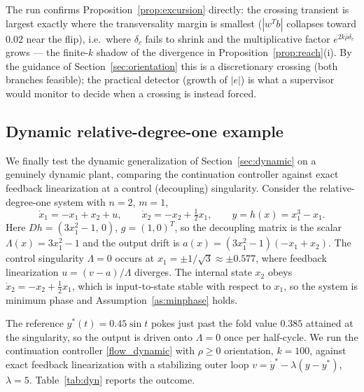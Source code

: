 \documentclass[11pt,american]{article}
\theoremstyle{definition}
\theoremstyle{plain}
\theoremstyle{remark}
\begin{document}
The run confirms Proposition~\ref{prop:excursion} directly: the crossing transient is largest exactly where the transversality margin is smallest ($|w^Tb|$ collapses toward $0.02$ near the flip), i.e.\ where $\delta_c$ fails to shrink and the multiplicative factor $e^{2k\bar\rho\delta_c}$ grows --- the finite-$k$ shadow of the divergence in Proposition~\ref{prop:reach}(i). By the guidance of Section~\ref{sec:orientation} this is a discretionary crossing (both branches feasible); the practical detector (growth of $|e|$) is what a supervisor would monitor to decide when a crossing is instead forced.


\subsection{Dynamic relative-degree-one example}

We finally test the dynamic generalization of Section~\ref{sec:dynamic} on a genuinely dynamic plant, comparing the continuation controller against exact feedback linearization at a control (decoupling) singularity. Consider the relative-degree-one system with $n = 2$, $m = 1$,
\begin{equation}\label{dyn_example}
\dot x_1 = -x_1 + x_2 + u, \qquad \dot x_2 = -x_2 + \tfrac12 x_1, \qquad y = h(x) = x_1^3 - x_1 .
\end{equation}
Here $D h = (3x_1^2 - 1,\,0)$, $g = (1,0)^T$, so the decoupling matrix is the scalar $\Lambda(x) = 3x_1^2 - 1$ and the output drift is $a(x) = (3x_1^2-1)(-x_1+x_2)$. The control singularity $\Lambda = 0$ occurs at $x_1 = \pm 1/\sqrt3 \approx \pm 0.577$, where feedback linearization $u = (v - a)/\Lambda$ diverges. The internal state $x_2$ obeys $\dot x_2 = -x_2 + \tfrac12 x_1$, which is input-to-state stable with respect to $x_1$, so the system is minimum phase and Assumption~\ref{as:minphase} holds.

The reference $y^*(t) = 0.45\sin t$ pokes just past the fold value $0.385$ attained at the singularity, so the output is driven onto $\Lambda = 0$ once per half-cycle. We run the continuation controller \eqref{flow_dynamic} with $\rho \ge 0$ orientation, $k = 100$, against exact feedback linearization with a stabilizing outer loop $v = \dot y^* - \lambda(y - y^*)$, $\lambda = 5$. Table~\ref{tab:dyn} reports the outcome.
\end{document}
